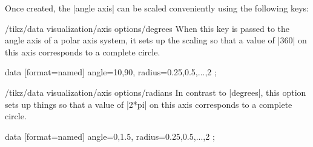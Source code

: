 Once created, the |angle axis| can be scaled conveniently using the following
keys:

\begin{key}{/tikz/data visualization/axis options/degrees}
    When this key is passed to the angle axis of a polar axis system, it sets
    up the scaling so that a value of |360| on this axis corresponds to a
    complete circle.
\begin{codeexample}[preamble={\usetikzlibrary{datavisualization.polar}}]
\tikz \datavisualization
    [new polar axes={angle axis}{radius axis},
     radius axis={unit length=1cm},
     angle axis={degrees},
     visualize as scatter]
  data [format=named] {
    angle={10,90}, radius={0.25,0.5,...,2}
  };
\end{codeexample}
\end{key}

\begin{key}{/tikz/data visualization/axis options/radians}
    In contrast to |degrees|, this option sets up things so that a value of
    |2*pi| on this axis corresponds to a complete circle.
\begin{codeexample}[preamble={\usetikzlibrary{datavisualization.polar}}]
\tikz \datavisualization
    [new polar axes={angle axis}{radius axis},
     radius axis={unit length=1cm},
     angle axis={radians},
     visualize as scatter]
  data [format=named] {
    angle={0,1.5}, radius={0.25,0.5,...,2}
  };
\end{codeexample}
\end{key}
